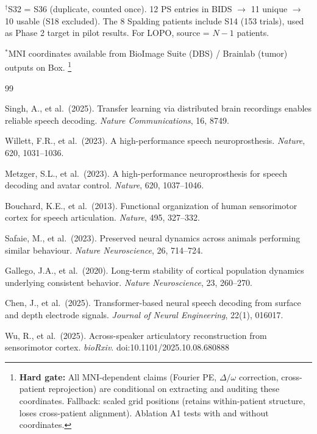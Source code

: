 \documentclass[11pt,letterpaper]{article}
\begin{document}
\noindent $^\dagger$S32 = S36 (duplicate, counted once). 12 PS entries in BIDS $\to$ 11 unique $\to$ 10 usable (S18 excluded). The 8 Spalding patients include S14 (153 trials), used as Phase 2 target in pilot results. For LOPO, source = $N{-}1$ patients.

\noindent $^*$MNI coordinates available from BioImage Suite (DBS) / Brainlab (tumor) outputs on Box.%
\footnote{\textbf{Hard gate:} All MNI-dependent claims (Fourier PE, $\Delta/\omega$ correction, cross-patient reprojection) are conditional on extracting and auditing these coordinates. Fallback: scaled grid positions (retains within-patient structure, loses cross-patient alignment). Ablation A1 tests with and without coordinates.}


\begin{thebibliography}{99}\raggedright

Singh, A., et al.\ (2025).
Transfer learning via distributed brain recordings enables reliable speech decoding.
\textit{Nature Communications}, 16, 8749.

Willett, F.R., et al.\ (2023).
A high-performance speech neuroprosthesis.
\textit{Nature}, 620, 1031--1036.

Metzger, S.L., et al.\ (2023).
A high-performance neuroprosthesis for speech decoding and avatar control.
\textit{Nature}, 620, 1037--1046.

Bouchard, K.E., et al.\ (2013).
Functional organization of human sensorimotor cortex for speech articulation.
\textit{Nature}, 495, 327--332.

Safaie, M., et al.\ (2023).
Preserved neural dynamics across animals performing similar behaviour.
\textit{Nature Neuroscience}, 26, 714--724.

Gallego, J.A., et al.\ (2020).
Long-term stability of cortical population dynamics underlying consistent behavior.
\textit{Nature Neuroscience}, 23, 260--270.

Chen, J., et al.\ (2025).
Transformer-based neural speech decoding from surface and depth electrode signals.
\textit{Journal of Neural Engineering}, 22(1), 016017.

Wu, R., et al.\ (2025).
Across-speaker articulatory reconstruction from sensorimotor cortex.
\textit{bioRxiv}. doi:10.1101/2025.10.08.680888


\end{thebibliography}
\end{document}
